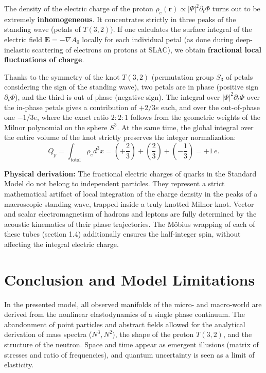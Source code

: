 \documentclass[11pt,a4paper]{article}
\begin{document}
The density of the electric charge of the proton $\rho_e(\mathbf{r}) \propto |\Psi|^2 \partial_t \Phi$ turns out to be extremely \textbf{inhomogeneous}. It concentrates strictly in three peaks of the standing wave (petals of $T(3,2)$). 
If one calculates the surface integral of the electric field $\mathbf{E} = -\nabla A_0$ locally for each individual petal (as done during deep-inelastic scattering of electrons on protons at SLAC), we obtain \textbf{fractional local fluctuations of charge}. 

Thanks to the symmetry of the knot $T(3,2)$ (permutation group $S_3$ of petals considering the sign of the standing wave), two petals are in phase (positive sign $\partial_t \Phi$), and the third is out of phase (negative sign). The integral over $|\Psi|^2 \partial_t \Phi$ over the in-phase petals gives a contribution of $+2/3 e$ each, and over the out-of-phase one $-1/3 e$, where the exact ratio $2:2:1$ follows from the geometric weights of the Milnor polynomial on the sphere $S^3$. At the same time, the global integral over the entire volume of the knot strictly preserves the integer normalization:
\begin{equation}
	Q_p = \int_{\text{total}} \rho_e d^3x = \left(+\frac{2}{3}\right) + \left(\frac{2}{3}\right) + \left(-\frac{1}{3}\right) = +1\,e.
\end{equation}

\textbf{Physical derivation:} The fractional electric charges of quarks in the Standard Model do not belong to independent particles. They represent a strict mathematical artifact of local integration of the charge density in the peaks of a macroscopic standing wave, trapped inside a truly knotted Milnor knot. Vector and scalar electromagnetism of hadrons and leptons are fully determined by the acoustic kinematics of their phase trajectories. The Möbius wrapping of each of these tubes (section 1.4) additionally ensures the half-integer spin, without affecting the integral electric charge.
	
\section*{Conclusion and Model Limitations}
	
	In the presented model, all observed manifolds of the micro- and macro-world are derived from the nonlinear elastodynamics of a single phase continuum. The abandonment of point particles and abstract fields allowed for the analytical derivation of mass spectra ($N^3, N^2$), the shape of the proton $T(3,2)$, and the structure of the neutron. Space and time appear as emergent illusions (matrix of stresses and ratio of frequencies), and quantum uncertainty is seen as a limit of elasticity.
	
\end{document}
